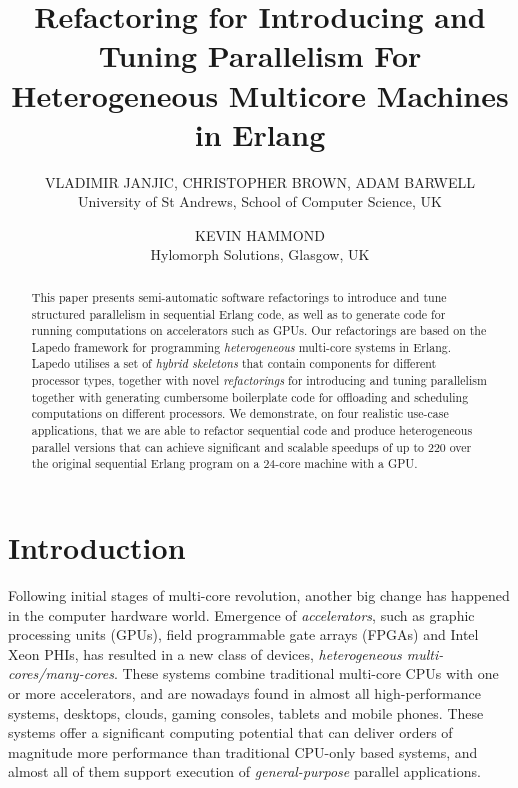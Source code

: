 \documentclass[final]{jfp1}
\title[Refactoring for Heterogeneous Parallelism in Erlang]
      {Refactoring for Introducing and Tuning Parallelism For Heterogeneous Multicore Machines in Erlang}
\author[V. Janjic et al]{VLADIMIR JANJIC, CHRISTOPHER BROWN, ADAM BARWELL \\
         University of St Andrews, School of Computer Science, UK\\
         \email{vj32@st-andrews.ac.uk, cmb21@st-andrews.ac.uk, adb23@st-andrews.ac.uk, kevin@kevinhammond.net} 
}
\author[K. Hammond]{KEVIN HAMMOND \\ Hylomorph Solutions, Glasgow, UK \\
	\email{kevin@kevinhammond.net}
}
\newcommand{\lapedo}{\xspace{\sc Lapedo}\xspace}
\newcommand{\Lapedo}{\lapedo}
\begin{document}
\label{firstpage}

\maketitle

\begin{abstract}
  This paper presents semi-automatic software refactorings to introduce and tune structured parallelism in sequential Erlang code, as well as to generate code for running computations on accelerators such as GPUs. Our refactorings are based on the \Lapedo{} framework for programming
  \emph{heterogeneous} multi-core systems in Erlang. \Lapedo{} utilises a set of \emph{hybrid
  skeletons} that contain components for different processor types, together with novel \emph{refactorings} for introducing and tuning parallelism together with generating cumbersome boilerplate code for offloading and scheduling 
  computations on different processors.
  We demonstrate, on four realistic use-case applications, that we are able to refactor 
  sequential code and produce heterogeneous parallel versions that can achieve significant and scalable speedups of up to 220
  over the original sequential Erlang program on a 24-core
  machine with a GPU. %
\end{abstract}


\section{Introduction}
\vspace{-6pt}
\noindent
Following initial stages of multi-core revolution, another big change has happened in the computer hardware world. Emergence of
\emph{accelerators}, such as graphic processing units (GPUs),
field programmable gate arrays (FPGAs) and Intel Xeon PHIs, has
resulted in a new class of devices, \emph{heterogeneous multi-cores/many-cores}.
These systems combine traditional multi-core CPUs with one or more
accelerators, and are nowadays found in almost all high-performance systems,
desktops, clouds, gaming consoles, tablets and mobile phones.
These systems
offer a significant computing potential that can deliver orders of magnitude
more performance than traditional CPU-only based systems, and almost all
of them support execution of \emph{general-purpose} parallel applications.
\end{document}
